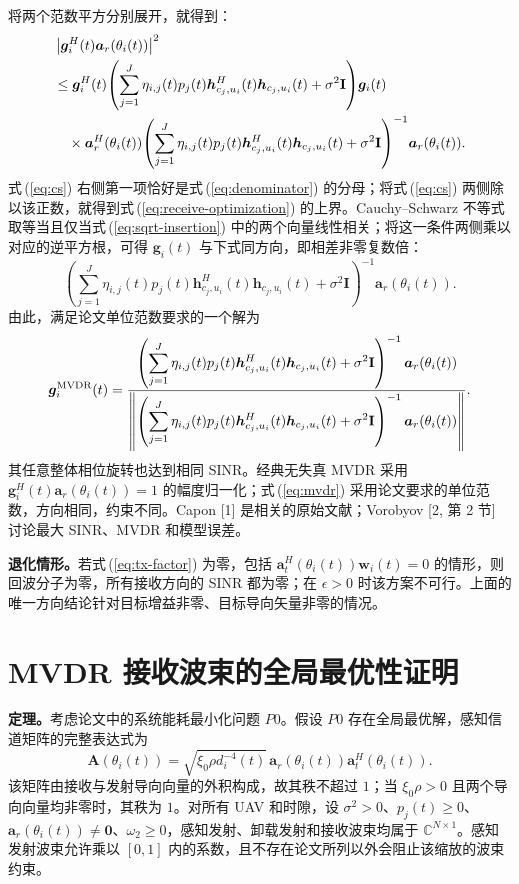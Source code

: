 \documentclass[11pt,a4paper]{ctexart}
\begin{document}
将两个范数平方分别展开，就得到：
\begin{align}
&\left|\bm g_i^H(t)\bm a_r(\theta_i(t))\right|^2\notag\\
&\le\bm g_i^H(t)\!\left(\sum_{j=1}^J\eta_{i,j}(t)p_j(t)
\bm h_{c_j,u_i}^{H}(t)\bm h_{c_j,u_i}(t)+\sigma^2\mathbf I\right)\!\bm g_i(t)\notag\\
&\quad\times\bm a_r^H(\theta_i(t))\!\left(\sum_{j=1}^J\eta_{i,j}(t)p_j(t)
\bm h_{c_j,u_i}^{H}(t)\bm h_{c_j,u_i}(t)+\sigma^2\mathbf I\right)^{-1}\!\bm a_r(\theta_i(t)).\label{eq:cs}
\end{align}
式\,(\ref{eq:cs}) 右侧第一项恰好是式\,(\ref{eq:denominator}) 的分母；将式\,(\ref{eq:cs}) 两侧除以该正数，就得到式\,(\ref{eq:receive-optimization}) 的上界。Cauchy--Schwarz 不等式取等当且仅当式\,(\ref{eq:sqrt-insertion}) 中的两个向量线性相关；将这一条件两侧乘以对应的逆平方根，可得 $\bm g_i(t)$ 与下式同方向，即相差非零复数倍：
\begin{equation}\label{eq:direction}
\left(\sum_{j=1}^J\eta_{i,j}(t)p_j(t)
\bm h_{c_j,u_i}^{H}(t)\bm h_{c_j,u_i}(t)+\sigma^2\mathbf I\right)^{-1}
\bm a_r(\theta_i(t)).
\end{equation}
由此，满足论文单位范数要求的一个解为
\begin{equation}\label{eq:mvdr}
\bm g_i^{\rm MVDR}(t)=
\frac{\left(\displaystyle\sum_{j=1}^J\eta_{i,j}(t)p_j(t)
\bm h_{c_j,u_i}^{H}(t)\bm h_{c_j,u_i}(t)+\sigma^2\mathbf I\right)^{-1}
\bm a_r(\theta_i(t))}
{\left\|\left(\displaystyle\sum_{j=1}^J\eta_{i,j}(t)p_j(t)
\bm h_{c_j,u_i}^{H}(t)\bm h_{c_j,u_i}(t)+\sigma^2\mathbf I\right)^{-1}
\bm a_r(\theta_i(t))\right\|}.
\end{equation}
其任意整体相位旋转也达到相同 SINR。经典无失真 MVDR 采用 $\bm g_i^H(t)\bm a_r(\theta_i(t))=1$ 的幅度归一化；式\,(\ref{eq:mvdr}) 采用论文要求的单位范数，方向相同，约束不同。Capon [1] 是相关的原始文献；Vorobyov [2, 第 2 节] 讨论最大 SINR、MVDR 和模型误差。

\textbf{退化情形。}若式\,(\ref{eq:tx-factor}) 为零，包括 $\bm a_t^H(\theta_i(t))\bm w_i(t)=0$ 的情形，则回波分子为零，所有接收方向的 SINR 都为零；在 $\epsilon>0$ 时该方案不可行。上面的唯一方向结论针对目标增益非零、目标导向矢量非零的情况。

\section{MVDR 接收波束的全局最优性证明}

\noindent\textbf{定理。}考虑论文中的系统能耗最小化问题 $P0$。假设 $P0$ 存在全局最优解，感知信道矩阵的完整表达式为
\begin{equation}\label{eq:theorem-channel}
\mathbf A(\theta_i(t))=\sqrt{\xi_0\rho d_i^{-4}(t)}\,
\bm a_r(\theta_i(t))\bm a_t^H(\theta_i(t)).
\end{equation}
该矩阵由接收与发射导向向量的外积构成，故其秩不超过 $1$；当 $\xi_0\rho>0$ 且两个导向向量均非零时，其秩为 $1$。对所有 UAV 和时隙，设 $\sigma^2>0$、$p_j(t)\ge0$、$\bm a_r(\theta_i(t))\ne\bm0$、$\omega_2\ge0$，感知发射、卸载发射和接收波束均属于 $\mathbb C^{N\times1}$。感知发射波束允许乘以 $[0,1]$ 内的系数，且不存在论文所列以外会阻止该缩放的波束约束。
\end{document}
